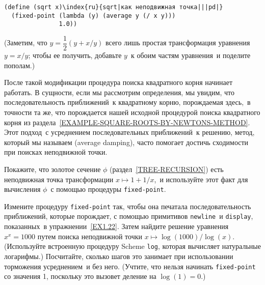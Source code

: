 \begin{Verbatim}[fontsize=\small]
(define (sqrt x)\index{ru}{sqrt|как неподвижная точка|||pd|}
  (fixed-point (lambda (y) (average y (/ x y)))
               1.0))
\end{Verbatim}
(Заметим, что $y = \dfrac{1}{2} (y + x / y)$ всего лишь
простая трансформация уравнения $y = x / y$; чтобы ее
получить, добавьте $y$~к обоим частям уравнения~и поделите
пополам.)

После такой модификации процедура поиска квадратного
корня начинает работать. В сущности, если мы рассмотрим определения,
мы увидим, что последовательность приближений~к квадратному корню,
порождаемая здесь,~в точности та же, что порождается нашей исходной
процедурой поиска квадратного корня из раздела~\ref{EXAMPLE-SQUARE-ROOTS-BY-NEWTONS-METHOD}. Этот
подход~с усреднением последовательных приближений~к решению, метод,
который мы называем 
 (average damping), часто помогает достичь сходимости при поисках неподвижной
точки.
\begin{exercise}{1.35}\label{EX1.35}%
Покажите, что золотое сечение $\phi$ 
(раздел~\ref{TREE-RECURSION}) есть неподвижная точка трансформации
$x \mapsto 1 + 1 / x$,~и используйте этот факт для
вычисления $\phi$~с помощью процедуры {\tt fixed-point}.
\end{exercise}
\begin{exercise}{1.36}\label{EX1.36}%
Измените процедуру {\tt fixed-point} так, чтобы
она печатала последовательность приближений, которые порождает, с
помощью примитивов {\tt newline}~и {\tt display},
показанных~в упражнении~\ref{EX1.22}. Затем найдите решение
уравнения $x^x = 1000$ путем поиска неподвижной точки
$x \mapsto \log (1000) / \log (x)$. (Используйте
встроенную процедуру Scheme {\tt log},
которая вычисляет
натуральные логарифмы.) Посчитайте, сколько шагов это занимает при
использовании торможения усреднением~и без него. (Учтите, что нельзя
начинать {\tt fixed-point} со значения 1, поскольку это вызовет 
деление на $\log(1) = 0$.)
\end{exercise}
